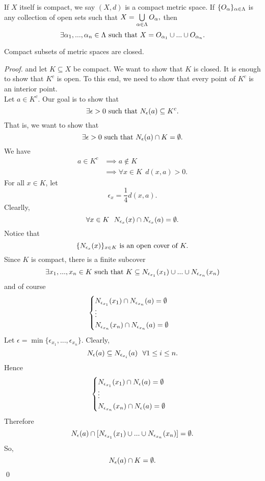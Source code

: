 	\begin{remark}
		If $X$ itself is compact, we say $(X,d)$ is a compact metric space.
		If $\{O_\alpha \}_{\alpha \in \Lambda}$ is any collection of open sets such that $X= \bigcup \limits_{\alpha \in \Lambda} O _\alpha,$ then
		$$\exists \alpha_{1}, ..., \alpha_n \in \Lambda \text{ such that } X = O_{\alpha_1} \cup ... \cup O_{\alpha_n}.$$
	\end{remark}
	
	\begin{theorem}
		Compact subsets of metric spaces are closed.
	\end{theorem}
	\begin{proof}
		\routineMS and let $K\subseteq X$ be compact. We want to show that $K$ is closed. It is enough to show that $K^c$ is open. To this end, we need to show that every point of $K^c$ is an interior point. \\
		Let $a\in K^c$. Our goal is to show that $$\exists \epsilon > 0 \text{ such that } N_{\epsilon}(a) \subseteq K^c.$$
		That is, we want to show that $$\exists \epsilon > 0 \text{ such that } N_{\epsilon}(a) \cap K = \emptyset.$$
		We have
		\begin{align*}
			a \in K^c &\implies a \not \in K \\
			&\implies \forall x \in K ~~ d(x,a) > 0.
		\end{align*}
		For all $x\in K$, let $$\epsilon_x = \frac{1}{4}d(x,a).$$
		Clearlly, $$\forall x \in K ~~ N_{\epsilon_x}(x) \cap N_{\epsilon_x}(a) = \emptyset.$$
		Notice that $$\{N_{\epsilon_x}(x)\}_{x\in K} \text { is an open cover of } K.$$
		Since $K$ is compact, there is a finite subcover $$\exists x_1,..., x_n \in K \text{ such that } K \subseteq N_{\epsilon_{x_1}}(x_1) \cup ... \cup N_{\epsilon_{x_n}}(x_n)$$
		and of course
		$$\begin{cases}
			N_{\epsilon_{x_1}}(x_1)\cap N_{\epsilon_{x_n}}(a) = \emptyset \\
			\vdots \\
			N_{\epsilon_{x_n}}(x_n)\cap N_{\epsilon_{x_n}}(a) = \emptyset
		\end{cases}$$
		Let $\epsilon=\min\{\epsilon_{x_1}, ..., \epsilon_{x_n}\}$. Clearly,
		$$N_{\epsilon}(a) \subseteq N_{\epsilon_{x_i}}(a) ~~ \forall 1 \leq i \leq n.$$
		Hence
		$$\begin{cases}
			N_{\epsilon_{x_1}}(x_1) \cap N_{\epsilon}(a) = \emptyset \\
			\vdots \\
			N_{\epsilon_{x_n}}(x_n) \cap N_{\epsilon}(a) = \emptyset
		\end{cases}$$
		Therefore
		$$
		N_{\epsilon}(a) \cap [ N_{\epsilon_{x_1}}(x_1)\cup ... \cup N_{\epsilon_{x_n}}(x_n)] =\emptyset.
		$$
		So,
		$$
			N_{\epsilon}(a) \cap K = \emptyset.
		$$
		\qed
	\end{proof}
	
